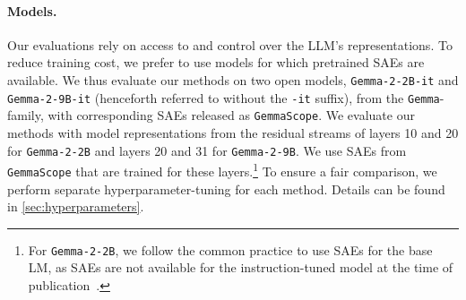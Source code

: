 \documentclass{article}
\theoremstyle{plain}
\theoremstyle{definition}
\theoremstyle{remark}
\renewcommand{\cite}{\citep}
\begin{document}
\paragraph{Models.} Our evaluations rely on access to and control over the LLM's representations. To reduce training cost, we prefer to use models for which pretrained SAEs are available. We thus evaluate our methods on two open models, \texttt{Gemma-2-2B-it} and \texttt{Gemma-2-9B-it} (henceforth referred to without the \texttt{-it} suffix), from the \texttt{Gemma}-family, with corresponding SAEs released as \texttt{GemmaScope}. We evaluate our methods with model representations from the residual streams of layers 10 and 20 for \texttt{Gemma-2-2B} and layers 20 and 31 for \texttt{Gemma-2-9B}. We use SAEs from \texttt{GemmaScope} that are trained for these layers.\footnote{For \texttt{Gemma-2-2B}, we follow the common practice to use SAEs for the base LM, as SAEs are not available for the instruction-tuned model at the time of publication~\cite{lieberum-etal-2024-gemma}.} To ensure a fair comparison, we perform separate hyperparameter-tuning for each method. Details can be found in \cref{sec:hyperparameters}.

 
\end{document}
